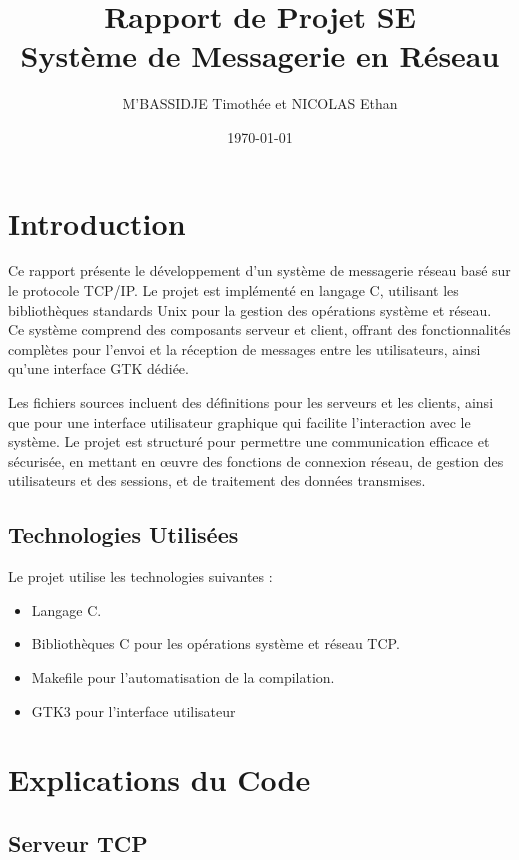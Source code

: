 \documentclass{article}
\title{Rapport de Projet SE\\ Système de Messagerie en Réseau}
\author{M'BASSIDJE Timothée et NICOLAS Ethan }
\date{\today}
\begin{document}
\maketitle

\section{Introduction}

Ce rapport présente le développement d'un système de messagerie réseau basé sur le protocole TCP/IP. Le projet est implémenté en langage C, utilisant les bibliothèques standards Unix pour la gestion des opérations système et réseau. Ce système comprend des composants serveur et client, offrant des fonctionnalités complètes pour l'envoi et la réception de messages entre les utilisateurs, ainsi qu'une interface GTK dédiée.

\vspace{0.3cm} Les fichiers sources incluent des définitions pour les serveurs et les clients, ainsi que pour une interface utilisateur graphique qui facilite l'interaction avec le système. Le projet est structuré pour permettre une communication efficace et sécurisée, en mettant en œuvre des fonctions de connexion réseau, de gestion des utilisateurs et des sessions, et de traitement des données transmises.

\subsection{Technologies Utilisées}
Le projet utilise les technologies suivantes :
\begin{itemize}
    \item Langage C.
    \item Bibliothèques C pour les opérations système et réseau TCP.
    \item Makefile pour l'automatisation de la compilation.
    \item GTK3 pour l'interface utilisateur
\end{itemize}

\section{Explications du Code}

\subsection{Serveur TCP}
\end{document}

